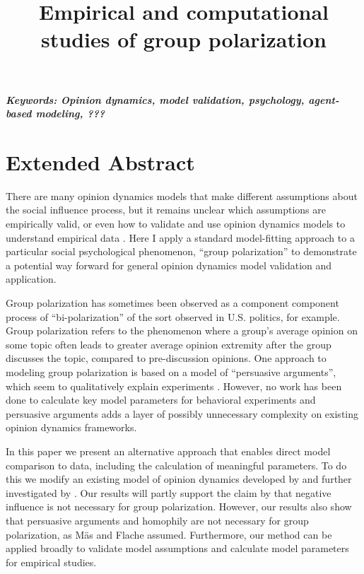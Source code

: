 \documentclass[a4paper,12pt]{article}
\title{Empirical and computational studies of group polarization}
\author[]{} %
\date{}
\begin{document}
\maketitle
\thispagestyle{fancy}

\vspace{-6em}
\begin{center}
\textbf{\textit{Keywords: Opinion dynamics, model validation, psychology, agent-based modeling, ???}}
\newline
\end{center}

\section*{Extended Abstract}

There are many opinion dynamics models that make different assumptions about
the social influence process, but it remains unclear which assumptions are
empirically valid, or even how to validate and use opinion dynamics models
to understand empirical data \cite{Flache2017}. 
Here I apply a standard model-fitting approach to 
a particular social psychological phenomenon, ``group
polarization'' \cite{Myers1982} to demonstrate a potential way 
forward for general opinion dynamics model validation and application. 

Group polarization has sometimes been observed as a component 
component process of ``bi-polarization'' of the
sort observed in U.S. politics, for example. Group
polarization refers to the phenomenon where a group's average opinion on 
some topic often leads to greater average opinion extremity 
after the group discusses the topic, compared to pre-discussion opinions.
One approach to 
modeling group polarization is based on a model of ``persuasive arguments'', 
which seem to qualitatively explain experiments \cite{Mas2013}.
However, no work has been done to calculate key model parameters for 
behavioral experiments and persuasive arguments adds a layer of possibly
unnecessary complexity on existing opinion dynamics frameworks.

In this paper we present an alternative approach that enables direct 
model comparison to data, including the calculation of meaningful parameters.
To do this we modify an existing model of opinion dynamics developed by
 and further investigated by . 
Our results will partly 
support the claim by  that negative influence is not necessary
for group polarization. However, our results also show that persuasive arguments
and homophily are not necessary for group polarization, as Mäs and Flache
assumed.  Furthermore, our method can be applied broadly to validate model assumptions 
and calculate model parameters for empirical studies.
\end{document}
